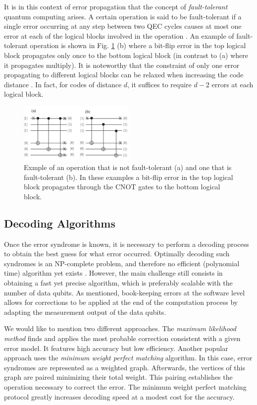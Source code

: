 It is in this context of error propagation that the concept of
\textit{fault-tolerant} quantum computing arises. A certain operation is said to
be fault-tolerant if a single error occurring at any step between two QEC cycles
causes at most one error at each of the logical blocks involved in the operation
\cite{Devitt_2013}. An example of fault-tolerant operation is shown in Fig.
\ref{fig:fault_tol} (b) where a bit-flip error in the top logical block
propagates only once to the bottom logical block (in contrast to (a) where it
propagates multiply). It is noteworthy that the constraint of only one
error propagating to different logical blocks can be relaxed when increasing the
code distance \cite{Devitt_2013}. In fact, for codes of distance $d$, it suffices
to require $d-2$ errors at each logical block.

\begin{figure}[htbp]
  \centering
  \includegraphics[width=0.5\textwidth]{images/fault_tolerance.pdf}
  \caption{Exmple of an operation that is not fault-tolerant (a) and one that is
    fault-tolerant (b). In these examples a bit-flip error in the top logical
    block propagates through the CNOT gates to the bottom logical block.}
  \label{fig:fault_tol}
\end{figure}

\subsection{Decoding Algorithms}
Once the error syndrome is known, it is necessary to perform a decoding process
to obtain the best guess for what error occurred. Optimally decoding such
syndromes is an NP-complete problem, and therefore no efficient (polynomial
time) algorithm yet exists \cite{Berlekamp}. However, the main challenge still
consists in obtaining a fast yet precise algorithm, which is preferably scalable
with the number of data qubits. As mentioned, book-keeping errors at the
software level allows for corrections to be applied at the end of the
computation process by adapting the measurement output of the data qubits.

We would like to mention two different approaches. The \textit{maximum
  likelihood method} \cite{Varsamopoulos_2020} finds and applies the most
probable correction consistent with a given error model. It features high
accuracy but low efficiency. Another popular approach uses the \textit{minimum
  weight perfect matching} \cite{fowler2013minimum} algorithm. In this case,
error syndromes are represented as a weighted graph. Afterwards, the vertices of
this graph are paired minimizing their total weight. This pairing establishes
the operation necessary to correct the error. The minimum weight perfect
matching protocol greatly increases decoding speed at a modest cost for the
accuracy.

